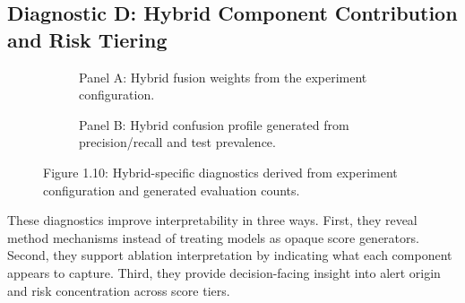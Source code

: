 \documentclass[12pt,a4paper]{report}
\begin{document}
\subsection{Diagnostic D: Hybrid Component Contribution and Risk Tiering}
\begin{figure}[H]
\centering
\begin{subfigure}[t]{0.49\textwidth}
\centering
{}
\caption{Panel A: Hybrid fusion weights from the experiment configuration.}
\end{subfigure}
\hfill
\begin{subfigure}[t]{0.49\textwidth}
\centering
{}
\caption{Panel B: Hybrid confusion profile generated from precision/recall and test prevalence.}
\end{subfigure}
\caption{Figure 1.10: Hybrid-specific diagnostics derived from experiment configuration and generated evaluation counts.}
\label{fig:diag_hybrid}
\end{figure}

These diagnostics improve interpretability in three ways. First, they reveal method mechanisms instead of treating models as opaque score generators. Second, they support ablation interpretation by indicating what each component appears to capture. Third, they provide decision-facing insight into alert origin and risk concentration across score tiers.
\end{document}
